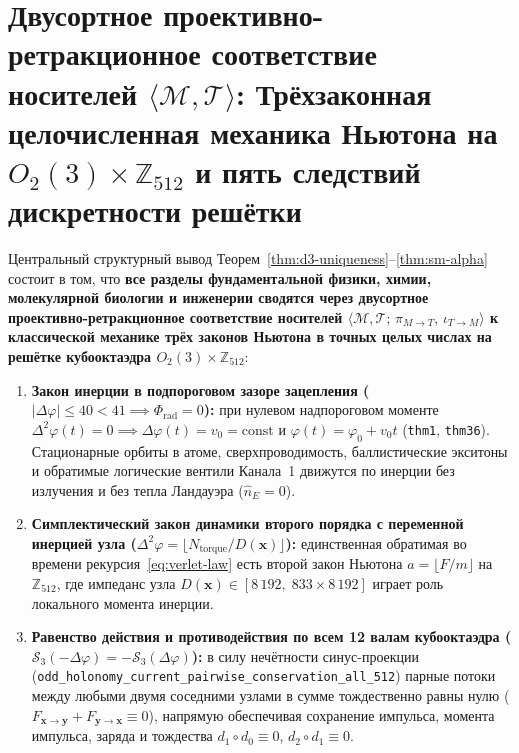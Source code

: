 \documentclass[11pt,a4paper]{article}
\theoremstyle{plain}
\theoremstyle{definition}
\begin{document}
\section{Двусортное проективно-ретракционное соответствие носителей \texorpdfstring{$\langle\mathcal{M},\mathcal{T}\rangle$}{<M,T>}: Трёхзаконная целочисленная механика Ньютона на \texorpdfstring{$O_2(3)\times\mathbb{Z}_{512}$}{O2(3) x Z512} и пять следствий дискретности решётки}
\label{sec:newtonian-homeomorphism}

Центральный структурный вывод Теорем~\ref{thm:d3-uniqueness}--\ref{thm:sm-alpha} состоит в том, что \textbf{все разделы фундаментальной физики, химии, молекулярной биологии и инженерии сводятся через двусортное проективно-ретракционное соответствие носителей $\langle\mathcal{M},\mathcal{T};\,\pi_{M\to T},\,\iota_{T\to M}\rangle$ к классической механике трёх законов Ньютона в точных целых числах на решётке кубооктаэдра $O_2(3)\times\mathbb{Z}_{512}$}:
\begin{enumerate}[label=\textbf{Закон Ньютона \Roman*.},leftmargin=*]
\item \textbf{Закон инерции в подпороговом зазоре зацепления ($|\Delta\varphi|\le 40 < 41 \implies \Phi_{\mathrm{rad}} = 0$):}
  при нулевом надпороговом моменте $\Delta^2\varphi(t) = 0 \implies \Delta\varphi(t) = v_0 = \mathrm{const}$ и $\varphi(t) = \varphi_0 + v_0 t$ (\texttt{thm1}, \texttt{thm36}). Стационарные орбиты в атоме, сверхпроводимость, баллистические экситоны и обратимые логические вентили Канала~1 движутся по инерции без излучения и без тепла Ландауэра ($\hat{n}_E = 0$).
\item \textbf{Симплектический закон динамики второго порядка с переменной инерцией узла ($\Delta^2\varphi = \lfloor N_{\mathrm{torque}}/D(\mathbf{x})\rfloor$):}
  единственная обратимая во времени рекурсия~\eqref{eq:verlet-law} есть второй закон Ньютона $a = \lfloor F/m\rfloor$ на $\mathbb{Z}_{512}$, где импеданс узла $D(\mathbf{x})\in[8\,192,\; 833\times 8\,192]$ играет роль локального момента инерции.
\item \textbf{Равенство действия и противодействия по всем 12 валам кубооктаэдра ($\mathcal{S}_3(-\Delta\varphi) = -\mathcal{S}_3(\Delta\varphi)$):}
  в силу нечётности синус-проекции (\texttt{odd\_holonomy\_current\_pairwise\_conservation\_all\_512}) парные потоки между любыми двумя соседними узлами в сумме тождественно равны нулю ($F_{\mathbf{x}\to\mathbf{y}} + F_{\mathbf{y}\to\mathbf{x}} \equiv 0$), напрямую обеспечивая сохранение импульса, момента импульса, заряда и тождества $d_1\circ d_0 \equiv 0$, $d_2\circ d_1 \equiv 0$.
\end{enumerate}
\end{document}

